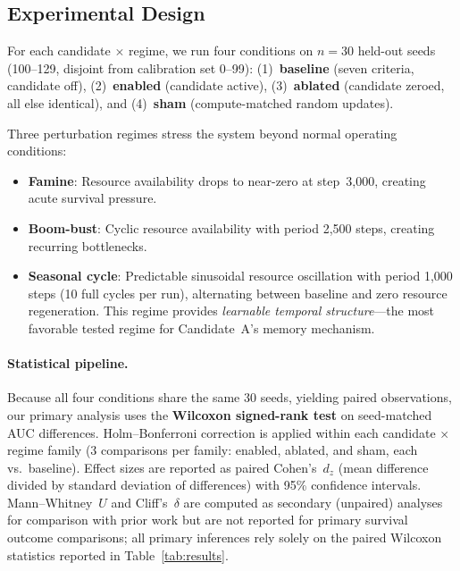 \documentclass[letterpaper]{article}
\begin{document}
\subsection{Experimental Design}

For each candidate $\times$ regime, we run four conditions on $n = 30$
held-out seeds (100--129, disjoint from calibration set 0--99):
(1)~\textbf{baseline} (seven criteria, candidate off),
(2)~\textbf{enabled} (candidate active),
(3)~\textbf{ablated} (candidate zeroed, all else identical), and
(4)~\textbf{sham} (compute-matched random updates).

Three perturbation regimes stress the system beyond normal operating
conditions:
\begin{itemize}
\item \textbf{Famine}: Resource availability drops to near-zero at
  step~3{,}000, creating acute survival pressure.
\item \textbf{Boom-bust}: Cyclic resource availability with period
  2{,}500 steps, creating recurring bottlenecks.
\item \textbf{Seasonal cycle}: Predictable sinusoidal resource
  oscillation with period 1{,}000 steps (10 full cycles per run),
  alternating between baseline and zero resource regeneration.
  This regime provides \emph{learnable temporal structure}---the
  most favorable tested regime for Candidate~A's memory mechanism.
\end{itemize}

\paragraph{Statistical pipeline.}
Because all four conditions share the same 30 seeds, yielding paired
observations, our primary analysis uses the \textbf{Wilcoxon signed-rank
test} \citep{wilcoxon_1945_individual} on seed-matched AUC differences.
Holm--Bonferroni correction \citep{holm_1979_simple} is applied within
each candidate $\times$ regime family (3 comparisons per family: enabled,
ablated, and sham, each vs.\ baseline).  Effect sizes are reported as
paired Cohen's~$d_z$ (mean difference divided by standard deviation of
differences) with 95\% confidence intervals.  Mann--Whitney~$U$
\citep{mann_1947_test} and Cliff's~$\delta$
\citep{cliff_1993_dominance} are computed as secondary (unpaired)
analyses for comparison with prior work but are not reported for
primary survival outcome comparisons; all primary inferences rely
solely on the paired Wilcoxon statistics reported in Table~\ref{tab:results}.
\end{document}
